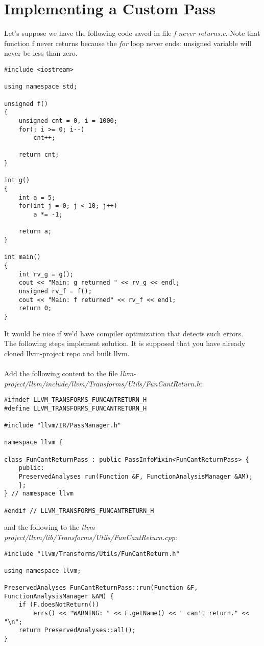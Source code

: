 \documentclass{report}
\begin{document}
\section *{Implementing a Custom Pass}
Let's suppose we have the following code saved in file \textit{f-never-returns.c}. Note that function f never returns because the \textit{for} loop never ends: unsigned variable will never be less than zero.
\begin{verbatim}
#include <iostream>
	
using namespace std;
	
unsigned f()
{
	unsigned cnt = 0, i = 1000;
	for(; i >= 0; i--)
	    cnt++;
	
	return cnt;
}
	
int g()
{
	int a = 5;
	for(int j = 0; j < 10; j++)
	    a *= -1;
	
	return a;
}
	
int main()
{
	int rv_g = g();
	cout << "Main: g returned " << rv_g << endl;
	unsigned rv_f = f();
	cout << "Main: f returned" << rv_f << endl;
	return 0;
}
\end{verbatim}
It would be nice if we'd have compiler optimization that detects such errors. \\The following steps implement solution. It is supposed that you have already cloned llvm-project repo and built llvm.
\\ \\
Add the following content to the file
\textit{llvm-project/llvm/include/llvm/Transforms/Utils/FunCantReturn.h}:
\begin{verbatim}
#ifndef LLVM_TRANSFORMS_FUNCANTRETURN_H
#define LLVM_TRANSFORMS_FUNCANTRETURN_H

#include "llvm/IR/PassManager.h"

namespace llvm {

class FunCantReturnPass : public PassInfoMixin<FunCantReturnPass> {
	public:
	PreservedAnalyses run(Function &F, FunctionAnalysisManager &AM);
	};
} // namespace llvm

#endif // LLVM_TRANSFORMS_FUNCANTRETURN_H
\end{verbatim}
and the following to the \textit{llvm-project/llvm/lib/Transforms/Utils/FunCantReturn.cpp}:
\begin{verbatim}
#include "llvm/Transforms/Utils/FunCantReturn.h"

using namespace llvm;

PreservedAnalyses FunCantReturnPass::run(Function &F,
FunctionAnalysisManager &AM) {
	if (F.doesNotReturn())
		errs() << "WARNING: " << F.getName() << " can't return." << "\n";
	return PreservedAnalyses::all();
}
\end{verbatim}
\end{document}
